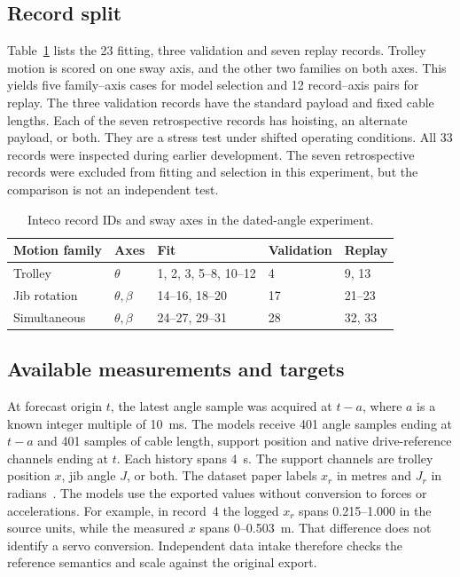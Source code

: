 \subsection{Record split}

Table~\ref{tab:splits} lists the 23 fitting, three validation and seven replay records. Trolley motion is scored on one sway axis, and the other two families on both axes. This yields five family--axis cases for model selection and 12 record--axis pairs for replay. The three validation records have the standard payload and fixed cable lengths. Each of the seven retrospective records has hoisting, an alternate payload, or both. They are a stress test under shifted operating conditions. All 33 records were inspected during earlier development. The seven retrospective records were excluded from fitting and selection in this experiment, but the comparison is not an independent test.

\begin{table}[htbp]
\centering
\caption{Inteco record IDs and sway axes in the dated-angle experiment.}
\label{tab:splits}
\begin{tabular}{@{}lllll@{}}
\toprule
Motion family & Axes & Fit & Validation & Replay \\
\midrule
Trolley & $\theta$ & 1, 2, 3, 5--8, 10--12 & 4 & 9, 13 \\
Jib rotation & $\theta,\beta$ & 14--16, 18--20 & 17 & 21--23 \\
Simultaneous & $\theta,\beta$ & 24--27, 29--31 & 28 & 32, 33 \\
\bottomrule
\end{tabular}
\end{table}

\subsection{Available measurements and targets}

At forecast origin $t$, the latest angle sample was acquired at $t-a$, where $a$ is a known integer multiple of 10~ms. The models receive 401 angle samples ending at $t-a$ and 401 samples of cable length, support position and native drive-reference channels ending at $t$. Each history spans 4~s. The support channels are trolley position $x$, jib angle $J$, or both. The dataset paper labels $x_r$ in metres and $J_r$ in radians~\cite{alhassan2025dataset}. The models use the exported values without conversion to forces or accelerations. For example, in record~4 the logged $x_r$ spans 0.215--1.000 in the source units, while the measured $x$ spans 0--0.503~m. That difference does not identify a servo conversion. Independent data intake therefore checks the reference semantics and scale against the original export.

